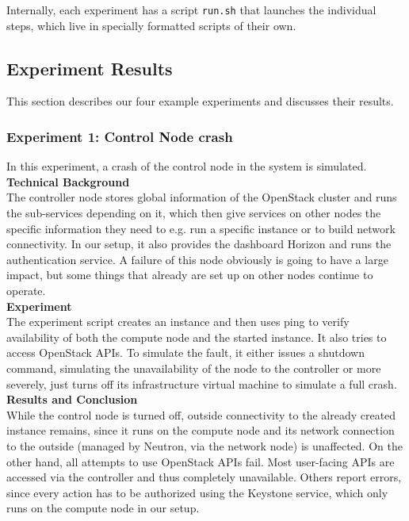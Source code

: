 Internally, each experiment has a script \texttt{run.sh} that launches the individual steps, which live in specially formatted scripts of their own.

\subsection{Experiment Results}
This section describes our four example experiments and discusses their results. 

\subsubsection{Experiment 1: Control Node crash}
In this experiment, a crash of the control node in the system is simulated. \\

\textbf{Technical Background}\\
The controller node stores global information of the OpenStack cluster and runs the sub-services depending on it, which then give services on other nodes the specific information they need to e.g. run a specific instance or to build network connectivity. In our setup, it also provides the dashboard Horizon and runs the authentication service. A failure of this node obviously is going to have a large impact, but some things that already are set up on other nodes continue to operate.\\

\textbf{Experiment}\\
The experiment script creates an instance and then uses ping to verify availability of both the compute node and the started instance. It also tries to access OpenStack APIs. To simulate the fault, it either issues a shutdown command, simulating the unavailability of the node to the controller or more severely, just turns off its infrastructure virtual machine to simulate a full crash.\\

\textbf{Results and Conclusion}\\
While the control node is turned off, outside connectivity to the already created instance remains, since it runs on the compute node and its network connection to the outside (managed by Neutron, via the network node) is unaffected. On the other hand, all attempts to use OpenStack APIs fail. Most user-facing APIs are accessed via the controller and thus completely unavailable. Others report errors, since every action has to be authorized using the Keystone service, which only runs on the compute node in our setup.\\


